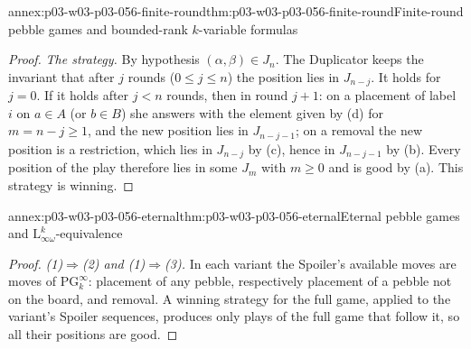 \begin{annexitem}{annex:p03-w03-p03-056-finite-round}{thm:p03-w03-p03-056-finite-round}{Finite-round pebble games and bounded-rank \(k\)-variable formulas}
\begin{proof}
\emph{The strategy.} By hypothesis \((\alpha,\beta)\in J_n\). The Duplicator
keeps the invariant that after \(j\) rounds (\(0\leq j\leq n\)) the position
lies in \(J_{n-j}\). It holds for \(j=0\). If it holds after \(j<n\) rounds,
then in round \(j+1\): on a placement of label \(i\) on \(a\in A\) (or
\(b\in B\)) she answers with the element given by (d) for
\(m=n-j\geq1\), and the new position lies in \(J_{n-j-1}\); on a removal the
new position is a restriction, which lies in \(J_{n-j}\) by (c), hence in
\(J_{n-j-1}\) by (b). Every position of the play therefore lies in some
\(J_m\) with \(m\geq0\) and is good by (a). This strategy is winning.
\end{proof}
\end{annexitem}

\begin{annexitem}{annex:p03-w03-p03-056-eternal}{thm:p03-w03-p03-056-eternal}{Eternal pebble games and \(\mathrm{L}^k_{\infty\omega}\)-equivalence}
\begin{proof}
\emph{(1)\(\Rightarrow\)(2) and (1)\(\Rightarrow\)(3).} In each variant the
Spoiler's available moves are moves of \(\mathrm{PG}^\infty_k\): placement of
any pebble, respectively placement of a pebble not on the board, and
removal. A winning strategy for the full game, applied to the variant's
Spoiler sequences, produces only plays of the full game that follow it, so
all their positions are good.


\end{proof}
\end{annexitem}
